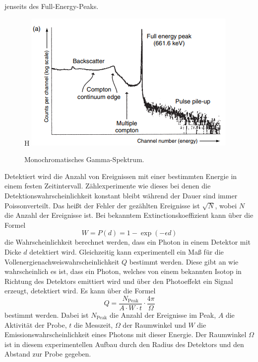 jenseits des Full-Energy-Peaks.
\begin{figure}{H}
    \centering
    \includegraphics[scale=1.0]{illustration/MonoSpektrum.png}
    \caption{Monochromatisches Gamma-Spektrum.\cite{GammaRay}}
    \label{fig:Mono}
\end{figure}
\noindent Detektiert wird die Anzahl von Ereignissen mit einer bestimmten Energie in einem festen Zeitintervall. Zählexperimente wie dieses
bei denen die Detektionswahrscheinlichkeit konstant bleibt während der Dauer sind immer Poissonverteilt.
Das heißt der Fehler der gezählten Ereignisse ist $\sqrt{N}$, wobei $N$ die Anzahl der Ereignisse ist. 
Bei bekanntem Extinctionskoeffizient kann über die Formel 
\begin{equation}
    \label{eq:Extinktion}
    W=P(d) = 1-\exp(-\epsilon d)
\end{equation}
die Wahrscheinlichkeit berechnet werden, dass ein Photon in einem Detektor mit Dicke $d$ detektiert wird.
Gleichzeitig kann experimentell ein Maß für die Vollenergienachweiswahrscheinlichkeit $Q$ bestimmt werden. Diese gibt an wie wahrscheinlich es ist, dass ein Photon, 
welches von einem bekannten Isotop in Richtung des Detektors emittiert wird und über den Photoeffekt ein Signal erzeugt, detektiert wird.
Es kann über die Formel 
\begin{equation}
    \label{eq:Q}
    Q = \frac{N_{\text{Peak}}}{A\cdot W\cdot t}\cdot\frac{4\pi}{\Omega}
\end{equation}
bestimmt werden. Dabei ist $N_{\text{Peak}}$ die Anzahl der Ereignisse im Peak, $A$ die Aktivität der Probe, $t$ die Messzeit, $\Omega$ der Raumwinkel und $W$ die Emissionswahrscheinlichkeit eines Photons mit dieser Energie.
Der Raumwinkel $\Omega$ ist in diesem experimentellen Aufbau durch den Radius des Detektors und den Abstand zur Probe gegeben.
